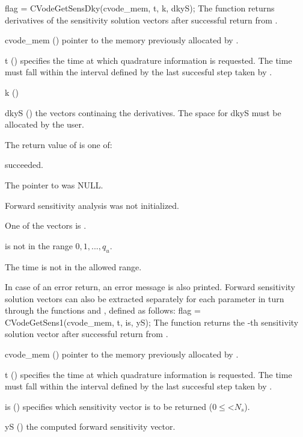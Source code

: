 {
  flag = CVodeGetSensDky(cvode\_mem, t, k, dkyS);
}
{
  The function  returns derivatives of the sensitivity solution 
  vectors after successful return from .
}
{
  \begin{args}
  \item[cvode\_mem] ()
    pointer to the memory previously allocated by .
  \item[t] ()
    specifies the time at which quadrature information is 
    requested. The time  must fall within the interval defined by the last 
    succesful step taken by {\cvodes}.
  \item[k] ()
  \item[dkyS] ()
    the vectors continaing the derivatives. The space for dkyS must be allocated by 
    the user. 
  \end{args}
}
{
  The return value  of  is one of:
  \begin{args}
  \item[\Id{OKAY}] 
     succeeded.
  \item[\Id{CVG\_NO\_MEM}] 
    The pointer to  was NULL.
  \item[\Id{CVG\_NO\_SENS}] 
    Forward sensitivity analysis was not initialized.
  \item[\Id{BAD\_DKY}] 
    One of the vectors  is .
  \item[\Id{BAD\_K}]
     is not in the range $0, 1, ..., q_u$.
  \item[\Id{BAD\_T}] 
    The time  is not in the allowed range.
  \end{args}
}
{
  In case of an error return, an error message is also printed.  
}
Forward sensitivity solution vectors can also be extracted separately for 
each parameter in turn through the functions  and
, defined as follows:
{
  flag = CVodeGetSens1(cvode\_mem, t, is, yS);
}
{
  The function  returns the -th sensitivity solution vector
  after successful return from .
}
{
  \begin{args}
  \item[cvode\_mem] ()
    pointer to the memory previously allocated by .
  \item[t] ()
    specifies the time at which quadrature information is 
    requested. The time  must fall within the interval defined by the last 
    succesful step taken by {\cvodes}.
  \item[is] () specifies which sensitivity vector is to be returned
    ($0\le$<$N_s$).
  \item[yS] ()
    the computed forward sensitivity vector.
  \end{args}
}
